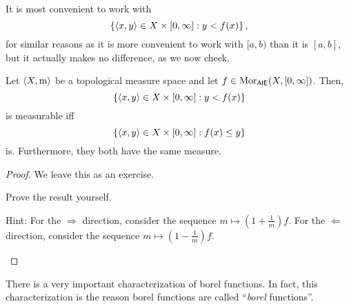 It is most convenient to work with
\begin{equation}
\left\{ \langle x,y\rangle\in X\times [0,\infty ]:y<f(x)\right\} ,
\end{equation}
for similar reasons as it is more convenient to work with $[a,b)$ than it is $[a,b]$, but it actually makes no difference, as we now check.
\begin{prp}
Let $\langle X,\mathrm{m}\rangle$ be a topological measure space and let $f\in \operatorname{Mor} _{\mathsf{AlE}}(X,[0,\infty ])$.  Then,
\begin{equation}
\left\{ \langle x,y\rangle\in X\times [0,\infty ]:y<f(x)\right\}
\end{equation}
is measurable iff
\begin{equation}
\left\{ \langle x,y\rangle\in X\times [0,\infty ]:f(x)\leq y\right\} 
\end{equation}
is.  Furthermore, they both have the same measure.
\begin{proof}
We leave this as an exercise.
\begin{exr}
Prove the result yourself.
\begin{rmk}
Hint:  For the $\Rightarrow$ direction, consider the sequence $m\mapsto \left( 1+\frac{1}{m}\right) f$.  For the $\Leftarrow$ direction, consider the sequence $m\mapsto \left( 1-\frac{1}{m}\right) f$.
\end{rmk}
\end{exr}
\end{proof}
\end{prp}
There is a very important characterization of borel functions.  In fact, this characterization is the reason borel functions are called  ``\emph{borel} functions''.
